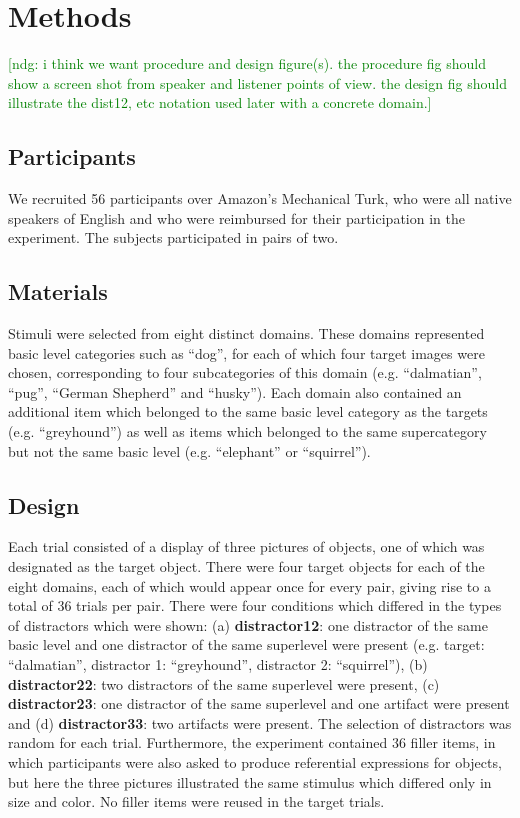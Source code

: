 \documentclass[10pt,letterpaper]{article}
\newcommand{\ndg}[1]{\textcolor{Green}{[ndg: #1]}}
\begin{document}
\section{\bf Methods}

\ndg{i think we want procedure and design figure(s). the procedure fig should show a screen shot from speaker and listener points of view. the design fig should illustrate the dist12, etc notation used later with a concrete domain.}

\subsection{\bf Participants}
We recruited 56 participants over Amazon’s Mechanical Turk, who were all native speakers of English and who were reimbursed for their participation in the experiment. The subjects participated in pairs of two.

\subsection{\bf Materials}
Stimuli were selected from eight distinct domains. These domains represented basic level categories such as ``dog'', for each of which four target images were chosen, corresponding to four subcategories of this domain (e.g. ``dalmatian'', ``pug'', ``German Shepherd'' and ``husky''). Each domain also contained an additional item which belonged to the same basic level category as the targets (e.g. ``greyhound'') as well as items which belonged to the same supercategory but not the same basic level (e.g. ``elephant'' or ``squirrel''). 

\subsection{\bf Design}
Each trial consisted of a display of three pictures of objects, one of which was designated as the target object. There were four target objects for each of the eight domains, each of which would appear once for every pair, giving rise to a total of 36 trials per pair. There were four conditions which differed in the types of distractors which were shown: (a) {\bf distractor12}: one distractor of the same basic level and one distractor of the same superlevel were present (e.g. target: ``dalmatian'', distractor 1: ``greyhound'', distractor 2: ``squirrel''), (b) {\bf distractor22}: two distractors of the same superlevel were present, (c) {\bf distractor23}: one distractor of the same superlevel and one artifact were present and (d) {\bf distractor33}: two artifacts were present. The selection of distractors was random for each trial. Furthermore, the experiment contained 36 filler items, in which participants were also asked to produce referential expressions for objects, but here the three pictures illustrated the same stimulus which differed only in size and color. No filler items were reused in the target trials.
\end{document}
